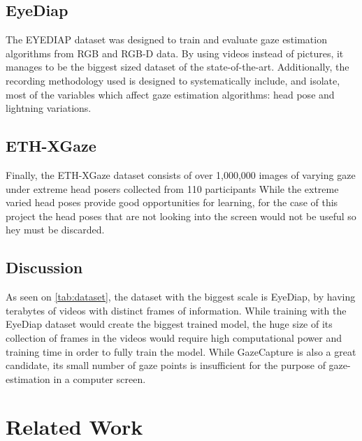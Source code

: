 \subsection{EyeDiap}
The EYEDIAP dataset was designed to train and evaluate gaze estimation algorithms from RGB and RGB-D data. By using videos instead of pictures,
it manages to be the biggest sized dataset of the state-of-the-art. Additionally, the recording methodology used is designed to systematically include, and isolate,
most of the variables which affect gaze estimation algorithms: head pose and lightning variations.

\subsection{ETH-XGaze}
Finally, the ETH-XGaze dataset \cite{Zhang2020ETHXGaze} consists of over 1,000,000 images of varying gaze under extreme head posers collected from 110 participants While the extreme varied head poses provide good opportunities for learning, for the case of this project the head poses that are not looking into the screen would not be useful so hey must be discarded.



\subsection{Discussion}
As seen on \autoref{tab:dataset}, the dataset with the biggest scale is EyeDiap, by having terabytes of videos with distinct frames of information.
While training with the EyeDiap dataset would create the biggest trained model, the huge size of its collection of frames in the videos would require high computational
power and training time in order to fully train the model. While GazeCapture is also a great candidate, its small number of gaze points 
is insufficient for the purpose of gaze-estimation in a computer screen.


\section{Related Work}

